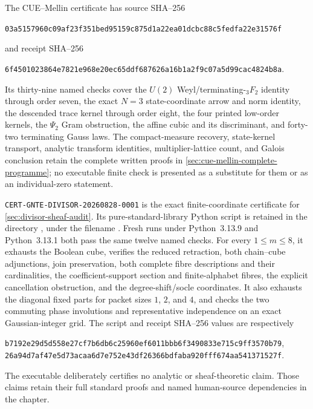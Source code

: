 The CUE--Mellin certificate has source SHA--256
\begin{center}\small
\texttt{03a5157960c09af23f351bed95159c875d1a22ea01dcbc88c5fedfa22e31576f}
\end{center}
and receipt SHA--256
\begin{center}\small
\texttt{6f4501023864e7821e968e20ec65ddf687626a16b1a2f9c07a5d99cac4824b8a}.
\end{center}
Its thirty-nine named checks cover the $U(2)$ Weyl/terminating-${}_3F_2$ identity through
order seven, the exact $N=3$ state-coordinate arrow and norm identity, the descended trace
kernel through order eight, the four printed low-order kernels, the $\Psi_2$ Gram obstruction,
the affine cubic and its discriminant, and forty-two terminating Gauss laws.  The
compact-measure recovery, state-kernel transport, analytic
transform identities, multiplier-lattice count, and Galois conclusion retain the complete
written proofs in \cref{sec:cue-mellin-complete-programme}; no executable finite check is
presented as a substitute for them or as an individual-zero statement.

\texttt{CERT-GNTE-DIVISOR-20260828-0001} is the exact finite-coordinate certificate for
\cref{sec:divisor-sheaf-audit}.  Its pure-standard-library Python script is retained in the
directory , under the filename
.  Fresh runs under Python~3.13.9 and Python~3.13.1
both pass the same twelve named checks.
For every $1\leq m\leq8$, it exhausts the Boolean cube, verifies the reduced retraction,
both chain--cube adjunctions, join preservation, both complete fibre descriptions and their
cardinalities, the coefficient-support section and finite-alphabet fibres, the explicit
cancellation obstruction, and the degree-shift/socle coordinates.  It also exhausts the
diagonal fixed parts for packet sizes $1$, $2$, and $4$, and checks the two commuting phase
involutions and representative independence on an exact Gaussian-integer grid.  The script
and receipt SHA--256 values are respectively
\begin{center}\small
\texttt{b7192e29d5d558e27cf7b6db6c25960ef6011bbb6f3490833e715c9ff3570b79},\\
\texttt{26a94d7af47e5d73acaa6d7e752e43df26366bdfaba920fff674aa541371527f}.
\end{center}
The executable deliberately certifies no analytic or sheaf-theoretic claim.  Those claims
retain their full standard proofs and named human-source dependencies in the chapter.

